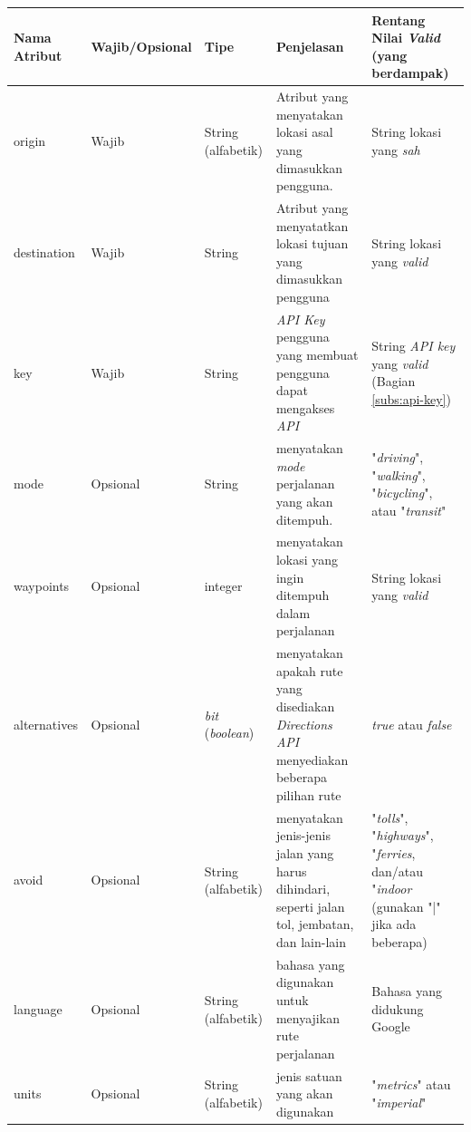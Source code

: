 \begin{table}[ht!]
\begin{tabular}{|p{3cm}|p{2.5cm}|p{2.5cm}|p{4cm}|p{3cm}|}
	\hline
	Nama Atribut & Wajib/Opsional & Tipe & Penjelasan & Rentang Nilai 		\textit{Valid} (yang berdampak)\\ \hline \hline
	origin & Wajib & String (alfabetik) &  Atribut yang menyatakan 		lokasi asal yang dimasukkan pengguna. & String lokasi yang \textit{sah} \\ \hline
	destination & Wajib & String & Atribut yang menyatatkan lokasi tujuan yang dimasukkan pengguna & String lokasi yang \textit{valid} \\ \hline
	key & Wajib & String & \textit{API Key} pengguna yang membuat pengguna dapat mengakses \textit{API} &  String \textit{API key} yang \textit{valid} (Bagian \ref{subs:api-key})  \\ \hline
	mode & Opsional & String & menyatakan \textit{mode} perjalanan yang akan ditempuh. & "\textit{driving}", "\textit{walking}", "\textit{bicycling}", atau "\textit{transit}"\\ \hline
	waypoints & Opsional & integer & menyatakan lokasi yang ingin ditempuh dalam perjalanan & String lokasi yang \textit{valid} \\ \hline
	alternatives & Opsional & \textit{bit} (\textit{boolean}) & menyatakan apakah rute yang disediakan \textit{Directions API} menyediakan beberapa pilihan rute & \textit{true} atau \textit{false} \\ \hline
	avoid & Opsional & String (alfabetik) & menyatakan jenis-jenis jalan yang harus dihindari, seperti jalan tol, jembatan, dan lain-lain & "\textit{tolls}", "\textit{highways}", "\textit{ferries}, dan/atau "\textit{indoor} (gunakan "|" jika ada beberapa) \\ \hline
	language & Opsional & String (alfabetik) & bahasa yang digunakan untuk menyajikan rute perjalanan & Bahasa yang didukung Google \\ \hline
	units & Opsional & String (alfabetik) & jenis satuan yang akan digunakan & "\textit{metrics}" atau "\textit{imperial}"\\ \hline

\end{tabular}
\end{table}
